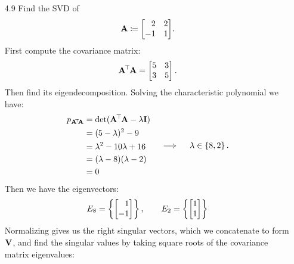 \documentclass[11pt]{article}
\begin{document}
\begin{enumerate}
          \pagebreak

    \item[4.9] Find the SVD of
          \[
              \mat{A} \coloneq
              \begin{bmatrix*}[r]
                  2 & 2 \\
                  -1 & 1 \\
              \end{bmatrix*}
              \! .
          \]
          First compute the covariance matrix:
          \[
              \mat{A}^{\T} \mat{A} =
              \begin{bmatrix*}[r]
                  5 & 3 \\
                  3 & 5 \\
              \end{bmatrix*}.
          \]
          Then find its eigendecomposition.  Solving the characteristic polynomial we have:
          \[
              \begin{aligned}
                  p_{\mathbf{A}^{\!{\mkern-2.5mu\top\mkern-2mu}} \! \mathbf{A}} & = \det(\mathbf{A}^{\mkern-2.5mu\top\mkern-2mu} \mathbf{A} - \lambda \mathbf{I}) \\
                                                  & = (5 - \lambda)^2 - 9                          \\
                                                  & = \lambda^2 - 10 \lambda + 16                  \\
                                                  & = (\lambda - 8)(\lambda - 2)                   \\
                                                  & = 0
              \end{aligned}
              \quad \implies \quad
              \lambda \in \left\{8, 2\right\}.
          \]
          Then we have the eigenvectors:
          \[
              E_8 = \set{
                  \begin{bmatrix*}[r]
                      1 \\ -1
                  \end{bmatrix*}
              },
              \qquad
              E_2 =  \set{
                  \begin{bmatrix}
                      1 \\ 1
                  \end{bmatrix}
              }
          \]
          Normalizing gives us the right singular vectors, which we concatenate to form $\mathbf{V}$,
          and find the singular values by taking square roots of the covariance matrix eigenvalues:

\end{enumerate}
\end{document}
